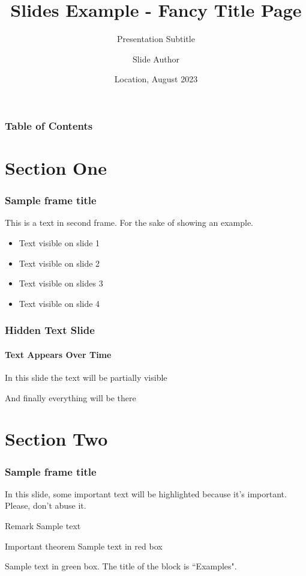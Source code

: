 \documentclass[aspectratio=1610]{beamer}
\title[Slides Example - Fancy Title Page] %
{Slides Example - Fancy Title Page}
\subtitle{Presentation Subtitle}
\author[Author, Slide] %
{Slide Author\inst{1}}
\institute[Institutional Affiliation] %
{
  \inst{1}%
  Institutional Affiliation
}
\date[2023.08] %
{Location, August 2023}
\begin{document}
\frame[b,nittanytitle]{\titlepage}

\begin{frame}
\frametitle{Table of Contents}
\tableofcontents
\end{frame}


\section{Section One}

\begin{frame}
\frametitle{Sample frame title}
This is a text in second frame. For the sake of showing an example.

\begin{itemize}
    \item<1-> Text visible on slide 1
    \item<2-> Text visible on slide 2
    \item<3> Text visible on slides 3
    \item<4-> Text visible on slide 4
\end{itemize}
\end{frame}


\begin{frame}
\frametitle{Hidden Text Slide}
\framesubtitle{Text Appears Over Time}
In this slide \pause
the text will be partially visible \pause

And finally everything will be there
\end{frame}

\section{Section Two}

\begin{frame}
\frametitle{Sample frame title}
In this slide, some important text will be
\alert{highlighted} because it's important.
Please, don't abuse it.

\begin{block}{Remark}
Sample text
\end{block}

\begin{alertblock}{Important theorem}
Sample text in red box
\end{alertblock}

\begin{examples}
Sample text in green box. The title of the block is ``Examples".
\end{examples}
\end{frame}
\end{document}
